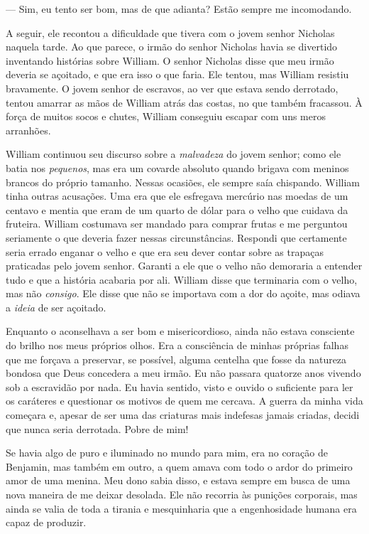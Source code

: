 --- Sim, eu tento ser bom, mas de que
adianta? Estão sempre me incomodando.

A seguir, ele recontou a dificuldade que tivera com o jovem senhor
Nicholas naquela tarde. Ao que parece, o irmão do senhor Nicholas havia
se divertido inventando histórias sobre William. O senhor Nicholas disse
que meu irmão deveria se açoitado, e que era isso o que faria. Ele
tentou, mas William resistiu bravamente. O jovem senhor de escravos, ao
ver que estava sendo derrotado, tentou amarrar as mãos de William atrás
das costas, no que também fracassou. À força de muitos socos e chutes,
William conseguiu escapar com uns meros arranhões.

William continuou seu discurso sobre a
\emph{malvadeza} do jovem senhor; como ele batia nos \emph{pequenos},
mas era um covarde absoluto quando brigava com meninos brancos do
próprio tamanho. Nessas ocasiões, ele sempre saía chispando. William
tinha outras acusações. Uma era que ele esfregava mercúrio nas moedas de
um centavo e mentia que eram de um quarto de dólar para o velho que
cuidava da fruteira. William costumava ser mandado para comprar frutas e
me perguntou seriamente o que deveria fazer nessas circunstâncias.
Respondi que certamente seria errado enganar o velho e que era seu dever
contar sobre as trapaças praticadas pelo jovem senhor. Garanti a ele que
o velho não demoraria a entender tudo e que a história acabaria por ali.
William disse que terminaria com o velho, mas não \emph{consigo}. Ele
disse que não se importava com a dor do açoite, mas odiava a
\emph{ideia} de ser açoitado.

Enquanto o aconselhava a ser bom e
misericordioso, ainda não estava consciente do brilho nos meus próprios
olhos. Era a consciência de minhas próprias falhas que me forçava a
preservar, se possível, alguma centelha que fosse da natureza bondosa
que Deus concedera a meu irmão. Eu não passara quatorze anos vivendo sob
a escravidão por nada. Eu havia sentido, visto e ouvido o suficiente
para ler os caráteres e questionar os motivos de quem me cercava. A
guerra da minha vida começara e, apesar de ser uma das criaturas mais
indefesas jamais criadas, decidi que nunca seria derrotada. Pobre de
mim!

Se havia algo de puro e iluminado no
mundo para mim, era no coração de Benjamin, mas também em outro, a quem
amava com todo o ardor do primeiro amor de uma menina. Meu dono sabia
disso, e estava sempre em busca de uma nova maneira de me deixar
desolada. Ele não recorria às punições corporais, mas ainda se valia de
toda a tirania e mesquinharia que a engenhosidade humana era capaz de
produzir.

